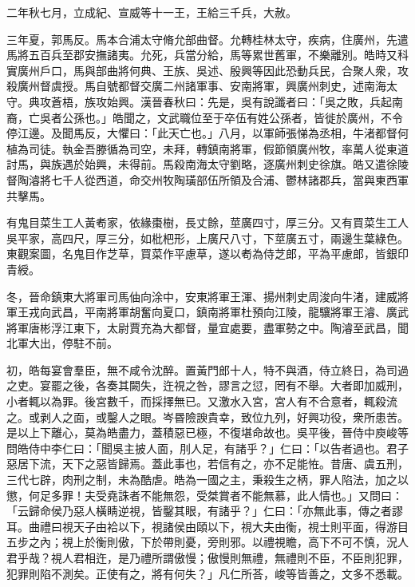 \begin{pinyinscope}
二年秋七月，立成紀、宣威等十一王，王給三千兵，大赦。

三年夏，郭馬反。馬本合浦太守脩允部曲督。允轉桂林太守，疾病，住廣州，先遣馬將五百兵至郡安撫諸夷。允死，兵當分給，馬等累世舊軍，不樂離別。皓時又科實廣州戶口，馬與部曲將何典、王族、吳述、殷興等因此恐動兵民，合聚人衆，攻殺廣州督虞授。馬自號都督交廣二州諸軍事、安南將軍，興廣州刺史，述南海太守。典攻蒼梧，族攻始興。漢晉春秋曰：先是，吳有說讖者曰：「吳之敗，兵起南裔，亡吳者公孫也。」皓聞之，文武職位至于卒伍有姓公孫者，皆徙於廣州，不令停江邊。及聞馬反，大懼曰：「此天亡也。」八月，以軍師張悌為丞相，牛渚都督何植為司徒。執金吾滕循為司空，未拜，轉鎮南將軍，假節領廣州牧，率萬人從東道討馬，與族遇於始興，未得前。馬殺南海太守劉略，逐廣州刺史徐旗。皓又遣徐陵督陶濬將七千人從西道，命交州牧陶璜部伍所領及合浦、鬱林諸郡兵，當與東西軍共擊馬。

有鬼目菜生工人黃耇家，依緣棗樹，長丈餘，莖廣四寸，厚三分。又有買菜生工人吳平家，高四尺，厚三分，如枇杷形，上廣尺八寸，下莖廣五寸，兩邊生葉綠色。東觀案圖，名鬼目作芝草，買菜作平慮草，遂以耇為侍芝郎，平為平慮郎，皆銀印青綬。

冬，晉命鎮東大將軍司馬伷向涂中，安東將軍王渾、揚州刺史周浚向牛渚，建威將軍王戎向武昌，平南將軍胡奮向夏口，鎮南將軍杜預向江陵，龍驤將軍王濬、廣武將軍唐彬浮江東下，太尉賈充為大都督，量宜處要，盡軍勢之中。陶濬至武昌，聞北軍大出，停駐不前。

初，皓每宴會羣臣，無不咸令沈醉。置黃門郎十人，特不與酒，侍立終日，為司過之吏。宴罷之後，各奏其闕失，迕視之咎，謬言之愆，罔有不舉。大者即加威刑，小者輒以為罪。後宮數千，而採擇無已。又激水入宮，宮人有不合意者，輒殺流之。或剥人之面，或鑿人之眼。岑昬險諛貴幸，致位九列，好興功役，衆所患苦。是以上下離心，莫為皓盡力，蓋積惡已極，不復堪命故也。吳平後，晉侍中庾峻等問皓侍中李仁曰：「聞吳主披人面，刖人足，有諸乎？」仁曰：「以告者過也。君子惡居下流，天下之惡皆歸焉。蓋此事也，若信有之，亦不足能恠。昔唐、虞五刑，三代七辟，肉刑之制，未為酷虐。皓為一國之主，秉殺生之柄，罪人陷法，加之以懲，何足多罪！夫受堯誅者不能無怨，受桀賞者不能無慕，此人情也。」又問曰：「云歸命侯乃惡人橫睛逆視，皆鑿其眼，有諸乎？」仁曰：「亦無此事，傳之者謬耳。曲禮曰視天子由袷以下，視諸侯由頤以下，視大夫由衡，視士則平面，得游目五步之內；視上於衡則傲，下於帶則憂，旁則邪。以禮視瞻，高下不可不慎，況人君乎哉？視人君相迕，是乃禮所謂傲慢；傲慢則無禮，無禮則不臣，不臣則犯罪，犯罪則陷不測矣。正使有之，將有何失？」凡仁所荅，峻等皆善之，文多不悉載。


\end{pinyinscope}
